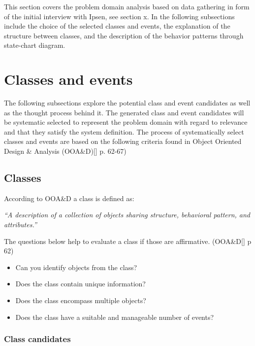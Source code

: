 This section covers the problem domain analysis based on data gathering in form of the initial interview with Ipsen, see section x. In the following subsections include the choice of the selected classes and events, the explanation of the structure between classes, and the description of the behavior patterns through state-chart diagram. 

\section{Classes and events}

The following subsections explore the potential class and event candidates as well as the thought process behind it. The generated class and event candidates will be systematic selected to represent the problem domain with regard to relevance and that they satisfy the system definition. The process of systematically select classes and events are based on the following criteria found in Object Oriented Design \& Analysis (OOA\&D)[] p. 62-67)

\subsection{Classes}
According to OOA\&D a class is defined as:

\textit{“A description of a collection of objects sharing structure, behavioral pattern, and attributes.”}

The questions below help to evaluate a class if those are affirmative. (OOA\&D[] p 62)

\begin{itemize}
	\item Can you identify objects from the class?
	\item Does the class contain unique information?
	\item Does the class encompass multiple objects?
	\item Does the class have a suitable and manageable number of events?
\end{itemize}

\subsubsection{Class candidates}



